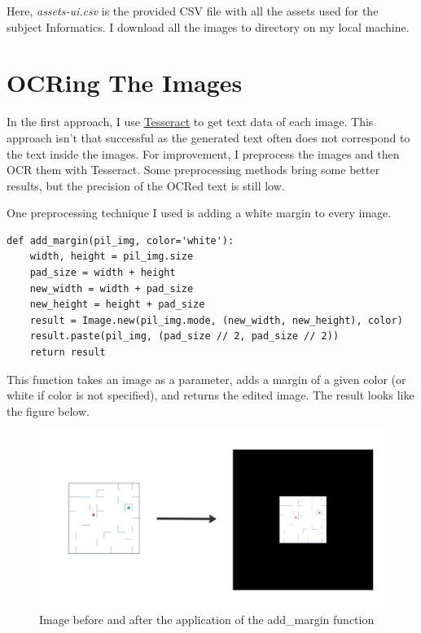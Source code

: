 \documentclass[
  digital,     %
  oneside,     %
  nosansbold,  %
  nocolorbold, %
  nolof,         %
  nolot,         %
]{fithesis4}
\begin{document}
Here, \emph{assets-ui.csv} is the provided CSV file with all the assets used for the subject Informatics. I download all the images to directory \emph{} on my local machine.

\section{OCRing The Images}

In the first approach, I use \hyperref[chap:ocr-tesseract]{Tesseract} to get text data of each image. This approach isn't that successful as the generated text often does not correspond to the text inside the images. For improvement, I preprocess the images and then OCR them with Tesseract. Some preprocessing methods bring some better results, but the precision of the OCRed text is still low.

One preprocessing technique I used is adding a white margin to every image.

\begin{verbatim}
def add_margin(pil_img, color='white'):
    width, height = pil_img.size
    pad_size = width + height
    new_width = width + pad_size
    new_height = height + pad_size
    result = Image.new(pil_img.mode, (new_width, new_height), color)
    result.paste(pil_img, (pad_size // 2, pad_size // 2))
    return result
\end{verbatim}

This function takes an image as a parameter, adds a margin of a given color (or white if color is not specified), and returns the edited image. The result looks like the figure below.

\begin{figure}[h]
\caption{Image before and after the application of the add\_margin function}
\includegraphics[width=\textwidth]{images/add-margin.jpeg}
\centering
\end{figure}
\end{document}
